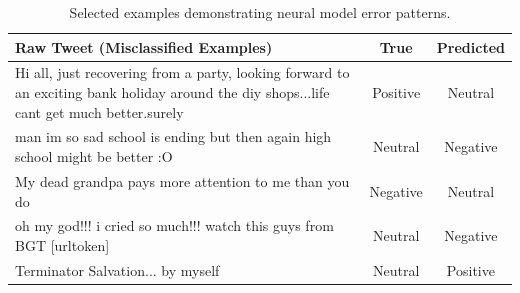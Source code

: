 \documentclass[12pt, a4paper]{article}
\begin{document}
\begin{table}[t]
    \centering
    \renewcommand{\arraystretch}{1.5}
    \begin{tabular}{|p{}|c|c|}
        \hline
        \textbf{Raw Tweet (Misclassified Examples)} & \textbf{True} & \textbf{Predicted} \\ \hline
        
        Hi all, just recovering from a party, looking forward to an exciting bank holiday around the diy shops...life cant get much better.surely & Positive & Neutral \\ \hline
        
        man im so sad school is ending but then again high school might be better :O & Neutral & Negative \\ \hline
        
        My dead grandpa pays more attention to me than you do & Negative & Neutral \\ \hline

        oh my god!!! i cried so much!!! watch this guys from BGT [urltoken] & Neutral & Negative \\ \hline
        
        Terminator Salvation... by myself & Neutral & Positive \\ \hline
    \end{tabular}
    \caption{Selected examples demonstrating neural model error patterns.}
    \label{tab:misclassifications}
\end{table}
\end{document}
